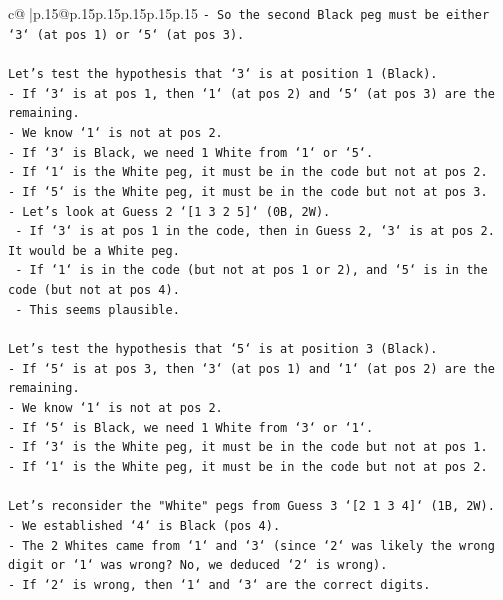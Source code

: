 \documentclass{article}
\begin{document}
{\begin{supertabular}{c@{$\;$}|p{.15\linewidth}@{}p{.15\linewidth}p{.15\linewidth}p{.15\linewidth}p{.15\linewidth}p{.15\linewidth}}
{{{\texttt{{-} So the second Black peg must be either `3` (at pos 1) or `5` (at pos 3).} \\
\\ 
\texttt{Let's test the hypothesis that `3` is at position 1 (Black).} \\
\texttt{{-} If `3` is at pos 1, then `1` (at pos 2) and `5` (at pos 3) are the remaining.} \\
\texttt{{-} We know `1` is not at pos 2.} \\
\texttt{{-} If `3` is Black, we need 1 White from `1` or `5`.} \\
\texttt{{-} If `1` is the White peg, it must be in the code but not at pos 2.} \\
\texttt{{-} If `5` is the White peg, it must be in the code but not at pos 3.} \\
\texttt{{-} Let's look at Guess 2 `{[}1 3 2 5{]}` (0B, 2W).} \\
\texttt{  {-} If `3` is at pos 1 in the code, then in Guess 2, `3` is at pos 2. It would be a White peg.} \\
\texttt{  {-} If `1` is in the code (but not at pos 1 or 2), and `5` is in the code (but not at pos 4).} \\
\texttt{  {-} This seems plausible.} \\
\\ 
\texttt{Let's test the hypothesis that `5` is at position 3 (Black).} \\
\texttt{{-} If `5` is at pos 3, then `3` (at pos 1) and `1` (at pos 2) are the remaining.} \\
\texttt{{-} We know `1` is not at pos 2.} \\
\texttt{{-} If `5` is Black, we need 1 White from `3` or `1`.} \\
\texttt{{-} If `3` is the White peg, it must be in the code but not at pos 1.} \\
\texttt{{-} If `1` is the White peg, it must be in the code but not at pos 2.} \\
\\ 
\texttt{Let's reconsider the "White" pegs from Guess 3 `{[}2 1 3 4{]}` (1B, 2W).} \\
\texttt{{-} We established `4` is Black (pos 4).} \\
\texttt{{-} The 2 Whites came from `1` and `3` (since `2` was likely the wrong digit or `1` was wrong? No, we deduced `2` is wrong).} \\
\texttt{{-} If `2` is wrong, then `1` and `3` are the correct digits.} \\
}}}
\end{supertabular}}
\end{document}
